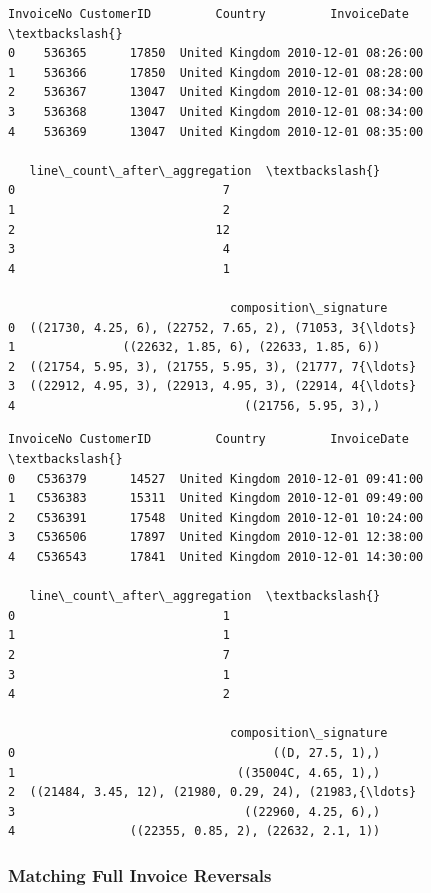 \documentclass[11pt]{article}
\begin{document}
    
    \begin{Verbatim}[commandchars=\\\{\}]
  InvoiceNo CustomerID         Country         InvoiceDate  \textbackslash{}
0    536365      17850  United Kingdom 2010-12-01 08:26:00   
1    536366      17850  United Kingdom 2010-12-01 08:28:00   
2    536367      13047  United Kingdom 2010-12-01 08:34:00   
3    536368      13047  United Kingdom 2010-12-01 08:34:00   
4    536369      13047  United Kingdom 2010-12-01 08:35:00   

   line\_count\_after\_aggregation  \textbackslash{}
0                             7   
1                             2   
2                            12   
3                             4   
4                             1   

                               composition\_signature  
0  ((21730, 4.25, 6), (22752, 7.65, 2), (71053, 3{\ldots}  
1               ((22632, 1.85, 6), (22633, 1.85, 6))  
2  ((21754, 5.95, 3), (21755, 5.95, 3), (21777, 7{\ldots}  
3  ((22912, 4.95, 3), (22913, 4.95, 3), (22914, 4{\ldots}  
4                                ((21756, 5.95, 3),)  
    \end{Verbatim}

    
    
    \begin{Verbatim}[commandchars=\\\{\}]
  InvoiceNo CustomerID         Country         InvoiceDate  \textbackslash{}
0   C536379      14527  United Kingdom 2010-12-01 09:41:00   
1   C536383      15311  United Kingdom 2010-12-01 09:49:00   
2   C536391      17548  United Kingdom 2010-12-01 10:24:00   
3   C536506      17897  United Kingdom 2010-12-01 12:38:00   
4   C536543      17841  United Kingdom 2010-12-01 14:30:00   

   line\_count\_after\_aggregation  \textbackslash{}
0                             1   
1                             1   
2                             7   
3                             1   
4                             2   

                               composition\_signature  
0                                    ((D, 27.5, 1),)  
1                               ((35004C, 4.65, 1),)  
2  ((21484, 3.45, 12), (21980, 0.29, 24), (21983,{\ldots}  
3                                ((22960, 4.25, 6),)  
4                ((22355, 0.85, 2), (22632, 2.1, 1))  
    \end{Verbatim}

    
    \subsubsection{Matching Full Invoice
Reversals}\label{matching-full-invoice-reversals}
\end{document}
